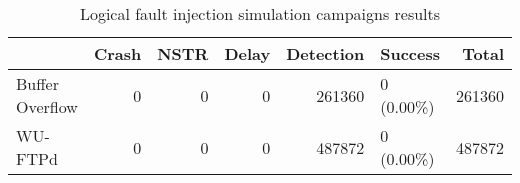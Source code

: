 \begin{table}[t]
\centering
\caption{Logical fault injection simulation campaigns results}
\label{table:end_sim_by_status_simple_parity_single_bitflip_temporel}
\begin{tabular}{lrrrrlr}
\toprule
 & Crash & NSTR & Delay & Detection & Success & Total \\
\midrule
Buffer Overflow & 0 & 0 & 0 & 261360 & 0 (0.00\%) & 261360 \\
WU-FTPd & 0 & 0 & 0 & 487872 & 0 (0.00\%) & 487872 \\
\bottomrule
\end{tabular}
\end{table}
